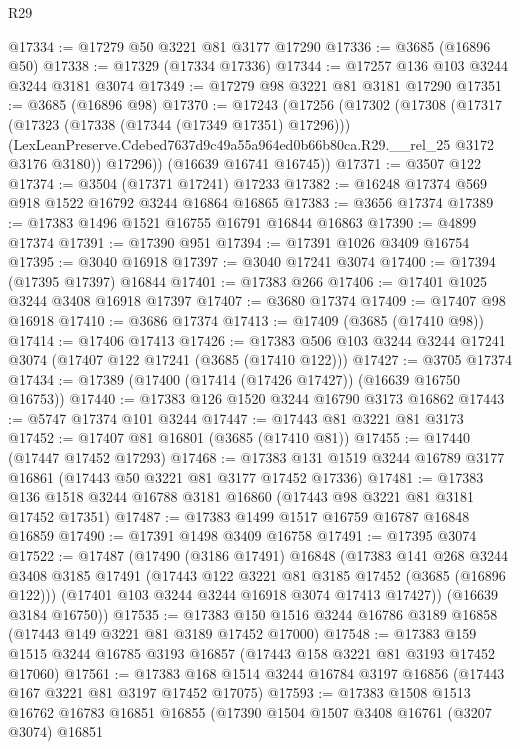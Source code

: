 \begin{lexlean}{R29}
\begin{coremodule}
@17334 := @17279 @50 @3221 @81 @3177 @17290
@17336 := @3685 (@16896 @50)
@17338 := @17329 (@17334 @17336)
@17344 := @17257 @136 @103 @3244 @3244 @3181 @3074
@17349 := @17279 @98 @3221 @81 @3181 @17290
@17351 := @3685 (@16896 @98)
@17370 := @17243
    (@17256
      (@17302
        (@17308
          (@17317
            (@17323 (@17338 (@17344 (@17349 @17351) @17296)))
            (LexLeanPreserve.Cdebed7637d9c49a55a964ed0b66b80ca.R29.__rel_25 @3172 @3176 @3180))
          @17296))
      (@16639 @16741 @16745))
@17371 := @3507 @122
@17374 := @3504 (@17371 @17241) @17233
@17382 := @16248 @17374 @569 @918 @1522 @16792 @3244 @16864 @16865
@17383 := @3656 @17374
@17389 := @17383 @1496 @1521 @16755 @16791 @16844 @16863
@17390 := @4899 @17374
@17391 := @17390 @951
@17394 := @17391 @1026 @3409 @16754
@17395 := @3040 @16918
@17397 := @3040 @17241 @3074
@17400 := @17394 (@17395 @17397) @16844
@17401 := @17383 @266
@17406 := @17401 @1025 @3244 @3408 @16918 @17397
@17407 := @3680 @17374
@17409 := @17407 @98 @16918
@17410 := @3686 @17374
@17413 := @17409 (@3685 (@17410 @98))
@17414 := @17406 @17413
@17426 := @17383 @506 @103 @3244 @3244 @17241 @3074 (@17407 @122 @17241 (@3685 (@17410 @122)))
@17427 := @3705 @17374
@17434 := @17389 (@17400 (@17414 (@17426 @17427)) (@16639 @16750 @16753))
@17440 := @17383 @126 @1520 @3244 @16790 @3173 @16862
@17443 := @5747 @17374 @101 @3244
@17447 := @17443 @81 @3221 @81 @3173
@17452 := @17407 @81 @16801 (@3685 (@17410 @81))
@17455 := @17440 (@17447 @17452 @17293)
@17468 := @17383 @131 @1519 @3244 @16789 @3177 @16861 (@17443 @50 @3221 @81 @3177 @17452 @17336)
@17481 := @17383 @136 @1518 @3244 @16788 @3181 @16860 (@17443 @98 @3221 @81 @3181 @17452 @17351)
@17487 := @17383 @1499 @1517 @16759 @16787 @16848 @16859
@17490 := @17391 @1498 @3409 @16758
@17491 := @17395 @3074
@17522 := @17487
    (@17490
      (@3186 @17491)
      @16848
      (@17383
        @141
        @268
        @3244
        @3408
        @3185
        @17491
        (@17443 @122 @3221 @81 @3185 @17452 (@3685 (@16896 @122)))
        (@17401 @103 @3244 @3244 @16918 @3074 @17413 @17427))
      (@16639 @3184 @16750))
@17535 := @17383 @150 @1516 @3244 @16786 @3189 @16858 (@17443 @149 @3221 @81 @3189 @17452 @17000)
@17548 := @17383 @159 @1515 @3244 @16785 @3193 @16857 (@17443 @158 @3221 @81 @3193 @17452 @17060)
@17561 := @17383 @168 @1514 @3244 @16784 @3197 @16856 (@17443 @167 @3221 @81 @3197 @17452 @17075)
@17593 := @17383
    @1508
    @1513
    @16762
    @16783
    @16851
    @16855
    (@17390
      @1504
      @1507
      @3408
      @16761
      (@3207 @3074)
      @16851

\end{coremodule}
\end{lexlean}
